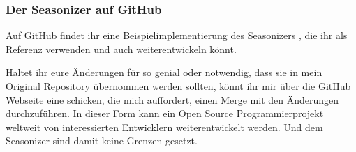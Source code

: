 \documentclass[parskip=half, final]{scrreprt}
\begin{document}
\begin{lecture}
\begin{itemize}
\end{itemize}


\subsubsection{Der Seasonizer auf GitHub}

Auf GitHub findet ihr eine Beispielimplementierung des Seasonizers , die ihr als Referenz verwenden und auch weiterentwickeln könnt.

Haltet ihr eure Änderungen für so genial oder notwendig, dass sie in mein Original Repository übernommen werden sollten, könnt ihr mir über die GitHub Webseite eine  schicken, die mich auffordert, einen Merge mit den Änderungen durchzuführen. In dieser Form kann ein Open Source Programmierprojekt weltweit von interessierten Entwicklern weiterentwickelt werden. Und dem Seasonizer sind damit keine Grenzen gesetzt.

\end{lecture}
\end{document}
